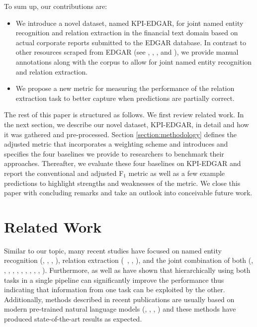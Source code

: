 \documentclass[conference, table]{IEEEtran}
\newcommand{\1} {\mathbbm{1}}
\begin{document}
To sum up, our contributions are:
\begin{itemize}
    \item We introduce a novel dataset, named KPI-EDGAR, for joint named entity recognition and relation extraction in the financial text domain based on actual corporate reports submitted to the EDGAR database. In contrast to other resources scraped from EDGAR (see \cite{han2016mining}, \cite{ashraf2017scraping}, \cite{loukas2021edgar}, and \cite{lonare2021edgar}), we provide manual annotations along with the corpus to allow for joint named entity recognition and relation extraction.
    \item We propose a new metric for measuring the performance of the relation extraction task to better capture when predictions are partially correct.
\end{itemize}

The rest of this paper is structured as follows. We first review related work. In the next section, we describe our novel dataset, KPI-EDGAR, in detail and how it was gathered and pre-processed. 
Section \ref{section:methodology} defines the adjusted metric that incorporates a weighting scheme and introduces and specifies the four baselines we provide to researchers to benchmark their approaches. Thereafter, we evaluate these four baselines on KPI-EDGAR and report the conventional and adjusted F$_1$ metric as well as a few example predictions to highlight strengths and weaknesses of the metric. We close this paper with concluding remarks and take an outlook into conceivable future work.

\section{Related Work}
Similar to our topic, many recent studies have focused on named entity recognition (\cite{lester2020constrained}, \cite{ushio2021t}, \cite{wang2021improving},  \cite{wang2021automated}), relation extraction (~\cite{xu2021entity}, \cite{zeng2020double}, \cite{zhangdocument}), and the joint combination of both (\cite{li2014incremental}, \cite{pappu2017lightweight}, \cite{eberts2019span}, \cite{liang2020bond}, \cite{shen2021trigger}, \cite{wang2020two}, \cite{ye2021pack}, \cite{zhong2021frustratingly}, \cite{tran2021improved}, \cite{hang2022joint}, \cite{savary2022relation}). Furthermore, \cite{fundel2007relex} as well as \cite{gurulingappa2012extraction} have shown that hierarchically using both tasks in a single pipeline can significantly improve the performance thus indicating that information from one task can be exploited by the other.
Additionally, methods described in recent publications are usually based on modern pre-trained natural language models (\cite{devlin2018bert}, \cite{liu2019roberta}, \cite{radford2018improving}, \cite{radford2019language}) and these methods have produced state-of-the-art results as expected.
\end{document}
